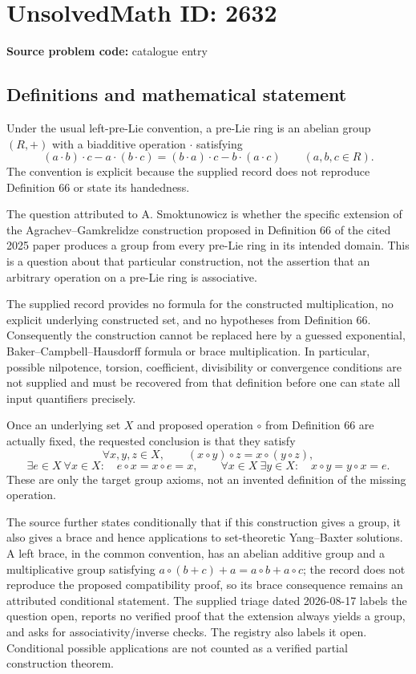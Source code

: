 \documentclass[11pt]{article}
\begin{document}
\section*{UnsolvedMath ID: 2632}
\textbf{Source problem code:} catalogue entry
\subsection{Definitions and mathematical statement}
Under the usual left-pre-Lie convention, a pre-Lie ring is an abelian group \((R,+)\) with a biadditive operation \(\cdot\) satisfying
\[
(a\cdot b)\cdot c-a\cdot(b\cdot c)
=(b\cdot a)\cdot c-b\cdot(a\cdot c)
\qquad(a,b,c\in R).
\]
The convention is explicit because the supplied record does not reproduce Definition 66 or state its handedness.

The question attributed to A. Smoktunowicz is whether the specific extension of the Agrachev--Gamkrelidze construction proposed in Definition 66 of the cited 2025 paper produces a group from every pre-Lie ring in its intended domain. This is a question about that particular construction, not the assertion that an arbitrary operation on a pre-Lie ring is associative.

The supplied record provides no formula for the constructed multiplication, no explicit underlying constructed set, and no hypotheses from Definition 66. Consequently the construction cannot be replaced here by a guessed exponential, Baker--Campbell--Hausdorff formula or brace multiplication. In particular, possible nilpotence, torsion, coefficient, divisibility or convergence conditions are not supplied and must be recovered from that definition before one can state all input quantifiers precisely.

Once an underlying set \(X\) and proposed operation \(\circ\) from Definition 66 are actually fixed, the requested conclusion is that they satisfy
\[
\forall x,y,z\in X,\qquad (x\circ y)\circ z=x\circ(y\circ z),
\]
\[
\exists e\in X\ \forall x\in X:\quad e\circ x=x\circ e=x,
\qquad
\forall x\in X\ \exists y\in X:\quad x\circ y=y\circ x=e.
\]
These are only the target group axioms, not an invented definition of the missing operation.

The source further states conditionally that if this construction gives a group, it also gives a brace and hence applications to set-theoretic Yang--Baxter solutions. A left brace, in the common convention, has an abelian additive group and a multiplicative group satisfying \(a\circ(b+c)+a=a\circ b+a\circ c\); the record does not reproduce the proposed compatibility proof, so its brace consequence remains an attributed conditional statement. The supplied triage dated 2026-08-17 labels the question open, reports no verified proof that the extension always yields a group, and asks for associativity/inverse checks. The registry also labels it open. Conditional possible applications are not counted as a verified partial construction theorem.
\end{document}
